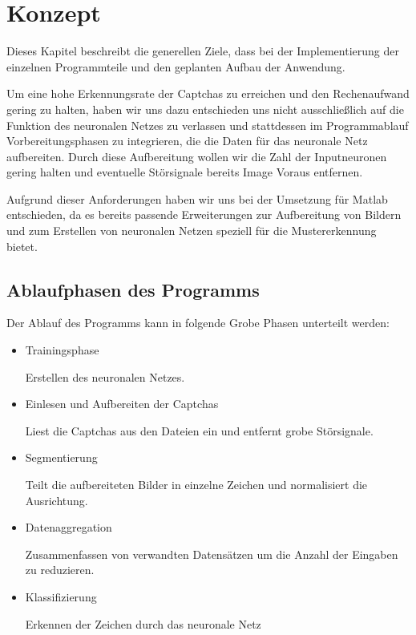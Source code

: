\section{Konzept}

Dieses Kapitel beschreibt die generellen Ziele, dass bei der
Implementierung der einzelnen Programmteile und den geplanten Aufbau der Anwendung.

Um eine hohe Erkennungsrate der Captchas zu erreichen und den Rechenaufwand
gering zu halten, haben wir uns dazu entschieden
uns nicht ausschließlich auf die Funktion des neuronalen Netzes zu verlassen
und stattdessen im Programmablauf Vorbereitungsphasen zu integrieren, die die
Daten für das neuronale Netz aufbereiten. Durch diese Aufbereitung wollen wir
die Zahl der Inputneuronen gering halten und eventuelle Störsignale bereits Image
Voraus entfernen.

Aufgrund dieser Anforderungen haben wir uns bei der Umsetzung für Matlab entschieden, 
da es bereits passende Erweiterungen zur Aufbereitung von Bildern und zum
Erstellen von neuronalen Netzen speziell für die Mustererkennung bietet.


\subsection{Ablaufphasen des Programms}

Der Ablauf des Programms kann in folgende Grobe Phasen unterteilt werden: 

\begin{itemize}

\item Trainingsphase

Erstellen des neuronalen Netzes.


\item Einlesen und Aufbereiten der Captchas

Liest die Captchas aus den Dateien ein und entfernt grobe Störsignale.


\item Segmentierung

Teilt die aufbereiteten Bilder in einzelne Zeichen und normalisiert die
Ausrichtung.


\item Datenaggregation

Zusammenfassen von verwandten Datensätzen um die Anzahl der Eingaben zu reduzieren.


\item Klassifizierung

Erkennen der Zeichen durch das neuronale Netz

\end{itemize}


